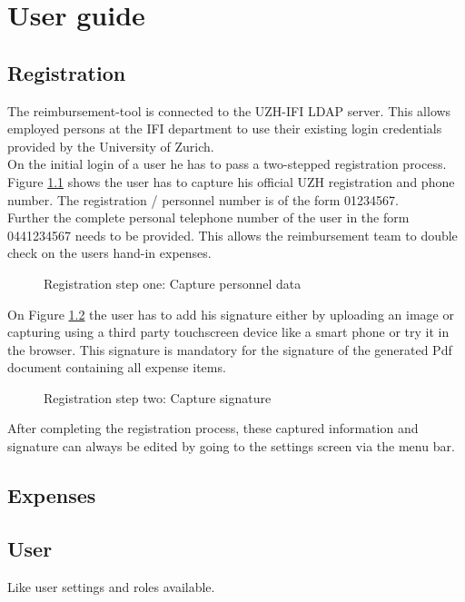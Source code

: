 \chapter{User guide}

\section{Registration}

The reimbursement-tool is connected to the UZH-IFI LDAP server. This allows employed persons at the IFI department to use their existing login credentials provided by the University of Zurich.\\
On the initial login of a user he has to pass a two-stepped registration process. Figure \ref{fig:registration-step01} shows the user has to capture his official UZH registration and phone number. The registration / personnel number is of the form 01234567.\\
Further the complete personal telephone number of the user in the form 0441234567 needs to be provided. This allows the reimbursement team to double check on the users hand-in expenses. 

\begin{figure}[H]
    \centering
    \caption{Registration step one: Capture personnel data}
    \label{fig:registration-step01}
\end{figure}

On Figure \ref{fig:registration-step02} the user has to add his signature either by uploading an image or capturing using a third party touchscreen device like a smart phone or try it in the browser. This signature is mandatory for the signature of the generated Pdf document containing all expense items.  

\begin{figure}[H]
    \centering
    \caption{Registration step two: Capture signature}
    \label{fig:registration-step02}
\end{figure}

After completing the registration process, these captured information and signature can always be edited by going to the settings screen via the menu bar.

\section{Expenses}



\section{User}

Like user settings and roles available.



